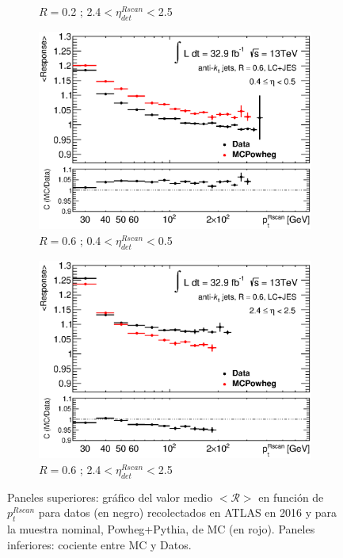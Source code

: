 \begin{figure}[ht]
\begin{subfigure}[b]{0.495\textwidth}
        \caption{$R=$0.2 ; 2.4$<\eta^{Rscan}_{det}<$2.5}
    \end{subfigure}
    \vfill
    \begin{subfigure}[b]{0.495\textwidth}
        \centering
        \includegraphics[width=\textwidth]{images/ResponseRatio6LC_49}
        \caption{$R=$0.6 ; 0.4$<\eta^{Rscan}_{det}<$0.5}
        \label{fig:fitFeo}
    \end{subfigure}
    \hfill
    \begin{subfigure}[b]{0.495\textwidth}
        \centering
        \includegraphics[width=\textwidth]{images/ResponseRatio6LC_69}
        \caption{$R=$0.6 ; 2.4$<\eta^{Rscan}_{det}<$2.5}
    \end{subfigure}
    \caption{ Paneles superiores: gráfico del valor medio $<\mathcal{R}>$ en función de $p_t^{Rscan}$ para datos (en negro) recolectados en ATLAS en 2016 y para la muestra nominal, Powheg+Pythia, de MC (en rojo). Paneles inferiores: cociente entre MC y Datos.} 
    \label{fig:Response}
\end{figure}


